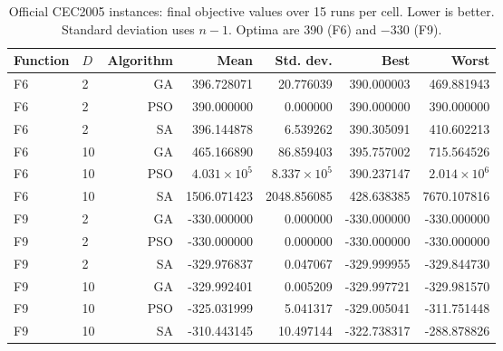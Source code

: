 \begin{table}[t]
\caption{Official CEC2005 instances: final objective values over 15 runs per cell. Lower is better. Standard deviation uses $n-1$. Optima are 390 (F6) and $-330$ (F9).}
\label{tab:t2-cec}\centering\small
\begin{tabular}{@{}llrrrrr@{}}\toprule
Function & $D$ & Algorithm & Mean & Std. dev. & Best & Worst\\\midrule
F6 & 2 & GA & 396.728071 & 20.776039 & 390.000003 & 469.881943\\
F6 & 2 & PSO & 390.000000 & 0.000000 & 390.000000 & 390.000000\\
F6 & 2 & SA & 396.144878 & 6.539262 & 390.305091 & 410.602213\\
\midrule
F6 & 10 & GA & 465.166890 & 86.859403 & 395.757002 & 715.564526\\
F6 & 10 & PSO & $4.031\times10^{5}$ & $8.337\times10^{5}$ & 390.237147 & $2.014\times10^{6}$\\
F6 & 10 & SA & 1506.071423 & 2048.856085 & 428.638385 & 7670.107816\\
\midrule
F9 & 2 & GA & -330.000000 & 0.000000 & -330.000000 & -330.000000\\
F9 & 2 & PSO & -330.000000 & 0.000000 & -330.000000 & -330.000000\\
F9 & 2 & SA & -329.976837 & 0.047067 & -329.999955 & -329.844730\\
\midrule
F9 & 10 & GA & -329.992401 & 0.005209 & -329.997721 & -329.981570\\
F9 & 10 & PSO & -325.031999 & 5.041317 & -329.005041 & -311.751448\\
F9 & 10 & SA & -310.443145 & 10.497144 & -322.738317 & -288.878826\\
\bottomrule\end{tabular}\end{table}
